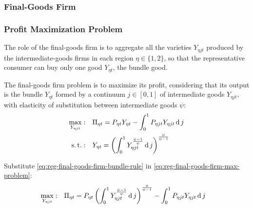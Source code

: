 \documentclass[../thesis.tex]{subfiles}
\begin{document}

\subsubsection{Final-Goods Firm}

\subsubsection*{Profit Maximization Problem}

The role of the final-goods firm is to aggregate all the varieties $Y_{\eta jt}$ produced by the intermediate-goods firms in each region $\eta \in \{1,2\}$, so that the representative consumer can buy only one good $Y_{\eta t}$, the bundle good.



The final-goods firm problem is to maximize its profit, considering that its output is the bundle $Y_{\eta t}$ formed by a continuum $j \in [0,1]$ of intermediate goods $Y_{\eta jt}$, with elasticity of substitution between intermediate goods $\psi$:
\begin{align}
	\max_{Y_{\eta jt}}: &\quad \Pi_{\eta t} = P_{\eta t} Y_{\eta t} - \int_{0}^{1} P_{\eta jt} Y_{\eta jt} \operatorname{d} j \label{eq:reg-final-goods-firm-max-problem} \\
	\operatorname{s.t.}: & \quad Y_{\eta t} = \left( \int_{0}^{1} Y_{\eta jt}^{\frac{\psi-1}{\psi}} \operatorname{d} j \right)^{\frac{\psi}{\psi-1}} \label{eq:reg-final-goods-firm-bundle-rule}
\end{align}

Substitute \ref{eq:reg-final-goods-firm-bundle-rule} in \ref{eq:reg-final-goods-firm-max-problem}:
\begin{align}
	\label{eq:reg-final-goods-firm-max-problem-2}
	\max_{Y_{\eta jt}}: & \quad \Pi_{\eta t} = P_{\eta t} \left( \int_{0}^{1} Y_{\eta jt}^{\frac{\psi-1}{\psi}} \operatorname{d} j \right)^{\frac{\psi}{\psi-1}} - \int_{0}^{1} P_{\eta jt} Y_{\eta jt} \operatorname{d} j
\end{align}
\end{document}

